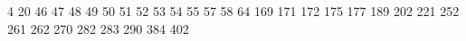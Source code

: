 4
20
46
47
48
49
50
51
52
53
54
55
57
58
64
169
171
172
175
177
189
202
221
252
261 
262
270
282
283
290
384
402


